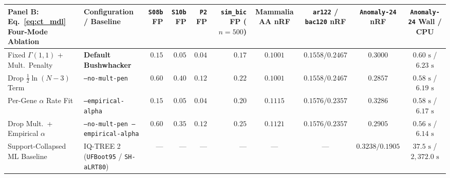 \documentclass[12pt]{article}
\begin{document}
\begin{table}[H]
{\begin{tabular}{@{}llrrrrcccc@{}}
\midrule
Panel B: Eq.~\eqref{eq:ct_mdl} Four-Mode Ablation & Configuration / Baseline & \texttt{S08b} FP & \texttt{S10b} FP & \texttt{P2} FP & \texttt{sim\_bic} FP ($n=500$) & Mammalia AA nRF & \texttt{ar122} / \texttt{bac120} nRF & \texttt{Anomaly-24} nRF & \texttt{Anomaly-24} Wall / CPU \\
\midrule
Fixed $\Gamma(1,1)$ + Mult.\ Penalty & \textbf{Default Bushwhacker} & $0.15$ & $0.05$ & $0.04$ & $0.17$ & $0.1001$ & $0.1558 / 0.2467$ & $0.3000$ & $0.60\text{ s}$ / $6.23\text{ s}$ \\
Drop $\frac{1}{2}\ln(N-3)$ Term & \texttt{--no-mult-pen} & $0.60$ & $0.40$ & $0.12$ & $0.22$ & $0.1001$ & $0.1558 / 0.2467$ & $0.2857$ & $0.58\text{ s}$ / $6.19\text{ s}$ \\
Per-Gene $\alpha$ Rate Fit & \texttt{--empirical-alpha} & $0.15$ & $0.05$ & $0.04$ & $0.20$ & $0.1115$ & $0.1576 / 0.2357$ & $0.3286$ & $0.58\text{ s}$ / $6.17\text{ s}$ \\
Drop Mult.\ + Empirical $\alpha$ & \texttt{--no-mult-pen --empirical-alpha} & $0.60$ & $0.35$ & $0.12$ & $0.25$ & $0.1121$ & $0.1576 / 0.2357$ & $0.2905$ & $0.56\text{ s}$ / $6.14\text{ s}$ \\
Support-Collapsed ML Baseline & IQ-TREE 2 (\texttt{UFBoot95} / \texttt{SH-aLRT80}) & --- & --- & --- & --- & --- & --- & $0.3238 / 0.1905$ & $37.5\text{ s}$ / $2,372.0\text{ s}$ \\
\bottomrule
\end{tabular}%
}
\end{table}

\clearpage


\end{document}
